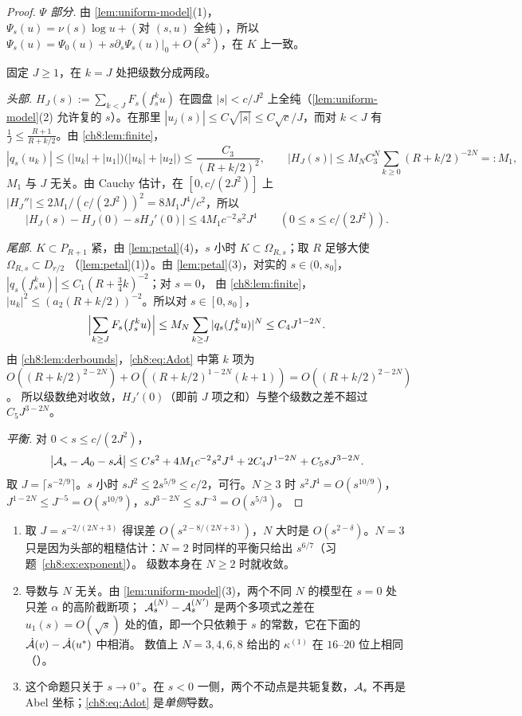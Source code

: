 \begin{proof}
\emph{$\Psi$ 部分.} 由 \cref{lem:uniform-model}(1)，$\Psi_s(u)=\nu(s)\log u+(\text{对 }(s,u)\text{ 全纯})$，所以
$\Psi_s(u)=\Psi_0(u)+s\partial_s\Psi_s(u)|_0+O(s^2)$，在 $K$ 上一致。

固定 $J\ge1$，在 $k=J$ 处把级数分成两段。

\emph{头部.} $H_J(s):=\sum_{k<J}F_s(f_s^ku)$ 在圆盘 $|s|<c/J^2$ 上全纯（\cref{lem:uniform-model}(2) 允许复的 $s$）。在那里
$|u_j(s)|\le C\sqrt{|s|}\le C\sqrt c/J$，而对 $k<J$ 有 $\frac1J\le\frac{R+1}{R+k/2}$。由 \cref{ch8:lem:finite}，
\[
 |q_s(u_k)|\le\bigl(|u_k|+|u_1|\bigr)\bigl(|u_k|+|u_2|\bigr)\le\frac{C_3}{(R+k/2)^2},\qquad
 |H_J(s)|\le M_NC_3^N\sum_{k\ge0}(R+k/2)^{-2N}=:M_1,
\]
$M_1$ 与 $J$ 无关。由 Cauchy 估计，在 $[0,c/(2J^2)]$ 上 $|H_J''|\le2M_1/(c/(2J^2))^2=8M_1J^4/c^2$，所以
\[
 \bigl|H_J(s)-H_J(0)-sH_J'(0)\bigr|\le4M_1c^{-2}s^2J^4\qquad(0\le s\le c/(2J^2)).
\]

\emph{尾部.} $K\subset P_{R+1}$ 紧，由 \cref{lem:petal}(4)，$s$ 小时 $K\subset\Omega_{R,s}$；取 $R$ 足够大使 $\Omega_{R,s}\subset D_{r/2}$
（\cref{lem:petal}(1)）。由 \cref{lem:petal}(3)，对实的 $s\in(0,s_0]$，$|q_s(f_s^ku)|\le C_1(R+\frac34k)^{-2}$；对 $s=0$，
由 \cref{ch8:lem:finite}，$|u_k|^2\le(a_2(R+k/2))^{-2}$。所以对 $s\in[0,s_0]$，
\[
 \Bigl|\sum_{k\ge J}F_s\bigl(f_s^ku\bigr)\Bigr|\le M_N\sum_{k\ge J}|q_s(f_s^ku)|^N\le C_4J^{1-2N}.
\]
由 \cref{ch8:lem:derbounds}，\eqref{ch8:eq:Adot} 中第 $k$ 项为 $O((R+k/2)^{2-2N})+O((R+k/2)^{1-2N}(k+1))=O((R+k/2)^{2-2N})$。
所以级数绝对收敛，$H_J'(0)$（即前 $J$ 项之和）与整个级数之差不超过 $C_5J^{3-2N}$。

\emph{平衡.} 对 $0<s\le c/(2J^2)$，
\[
 \bigl|\mathcal A_s-\mathcal A_0-s\dot{\mathcal A}\bigr|\le Cs^2+4M_1c^{-2}s^2J^4+2C_4J^{1-2N}+C_5sJ^{3-2N}.
\]
取 $J=\lceil s^{-2/9}\rceil$。$s$ 小时 $sJ^2\le2s^{5/9}\le c/2$，可行。$N\ge3$ 时
$s^2J^4=O(s^{10/9})$，$J^{1-2N}\le J^{-5}=O(s^{10/9})$，$sJ^{3-2N}\le sJ^{-3}=O(s^{5/3})$。
\end{proof}

\begin{remark}\label{ch8:rem:diff}
\begin{enumerate}
\item 取 $J=s^{-2/(2N+3)}$ 得误差 $O(s^{2-8/(2N+3)})$，$N$ 大时是 $O(s^{2-\delta})$。$N=3$ 只是因为头部的粗糙估计：$N=2$ 时同样的平衡只给出 $s^{6/7}$（习题~\ref{ch8:ex:exponent}）。
  级数本身在 $N\ge2$ 时就收敛。
\item 导数与 $N$ 无关。由 \cref{lem:uniform-model}(3)，两个不同 $N$ 的模型在 $s=0$ 处只差 $\alpha$ 的高阶截断项；
  $\mathcal A^{(N)}_s-\mathcal A^{(N')}_s$ 是两个多项式之差在 $u_1(s)=O(\sqrt s)$ 处的值，即一个只依赖于 $s$ 的常数，它在下面的 $\dot{\mathcal A}(v)-\dot{\mathcal A}(u^{*})$ 中相消。
  数值上 $N=3,4,6,8$ 给出的 $\kappa^{(1)}$ 在 $16$--$20$ 位上相同（\cite{KneserPaper}）。
\item 这个命题只关于 $s\to0^+$。在 $s<0$ 一侧，两个不动点是共轭复数，$\mathcal A_s$ 不再是 Abel 坐标；\eqref{ch8:eq:Adot} 是\emph{单侧}导数。
\end{enumerate}
\end{remark}

